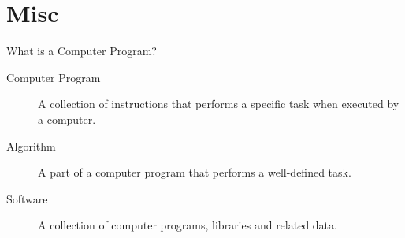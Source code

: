 \documentclass[../lecture2-variables.tex]{subfiles}
\begin{document}
\section{Misc}


\begin{frame}[fragile]{What is a Computer Program?}
    \begin{description}
        \item[Computer Program] A collection of instructions that performs a specific
        task when executed by a computer. \pause
        \item[Algorithm] A part of a computer program that performs a
        well-defined task. \pause
        \item[Software] A collection of computer programs, libraries and
        related data.
    \end{description}
\end{frame}

\end{document}
